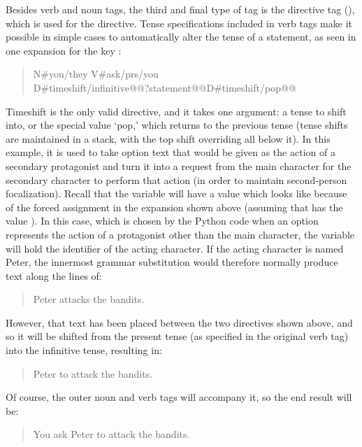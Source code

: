 Besides verb and noun tags, the third and final type of tag is the directive tag (), which is used for the  directive.
%
Tense specifications included in verb tags make it possible in simple cases to automatically alter the tense of a statement, as seen in one expansion for the key :

\begin{quote}
\ttfamily
N\#you/they V\#ask/prs/you \\
\ind D\#timeshift/infinitive@@?statement@@D\#timeshift/pop@@
\end{quote}

Timeshift is the only valid directive, and it takes one argument: a tense to shift into, or the special value `pop,' which returns to the previous tense (tense shifts are maintained in a stack, with the top shift overriding all below it).
%
In this example, it is used to take option text that would be given as the action of a secondary protagonist and turn it into a request from the main character for the secondary character to perform that action (in order to maintain second-person focalization).
%
Recall that the  variable will have a value which looks like  because of the forced assignment in the  expansion shown above (assuming that  has the value ).
%
In this case, which is chosen by the Python code when an option represents the action of a protagonist other than the main character, the  variable will hold the identifier of the acting character.
%
If the acting character is named Peter, the innermost grammar substitution would therefore normally produce text along the lines of:

\begin{quote}
  Peter attacks the bandits.
\end{quote}

However, that text has been placed between the two  directives shown above, and so it will be shifted from the present tense (as specified in the original verb tag) into the infinitive tense, resulting in:

\begin{quote}
  Peter to attack the bandits.
\end{quote}

Of course, the outer noun and verb tags will accompany it, so the end result will be:

\begin{quote}
  You ask Peter to attack the bandits.
\end{quote}

